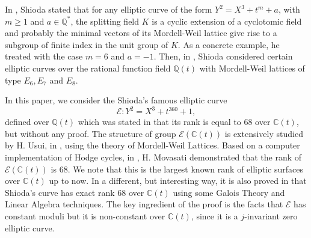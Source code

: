 \documentclass[11pt]{amsart}
\newcommand{\Q}{{\mathbb Q}}
\newcommand{\CC}{{\mathbb C}}
\newcommand{\Ee}{{\mathcal E}}
\newcommand{\KK}{{\mathcal K}}
\newcommand{\gal}{{\text{Gal}}}
\newcommand{\aut}{{\text{Aut}}}
\numberwithin{equation}{section}
\numberwithin{table}{section}
\newcommand\<{\langle}
\begin{document}

In \cite{Shioda1999a}, Shioda stated that for any elliptic curve of the form 
$Y^2 =X^3 + t^m +a$, with $m\geq 1$ and $a \in \Q^*$,  the splitting field $K$
is a cyclic extension of a cyclotomic field and probably the minimal vectors of its 
Mordell-Weil lattice give rise  to a subgroup of finite index in the unit group of $K$. 
As a concrete example, he treated with the case $m=6$ and $a=-1$.
Then, in \cite{Shioda1999}, Shioda considered certain elliptic curves over the rational function field  $\Q(t)$ with Mordell-Weil lattices of type $E_6, E_7$ and $E_8$.



In this paper, we  consider the  Shioda's famous  elliptic curve
\begin{equation}
	\label{shi-eq1}
	\Ee : Y^2=X^3 + t^{360} +1,
\end{equation}
defined over $\Q(t)$ which was stated in \cite{Shioda1992a} that its 
rank is equal to $68$ over $\CC(t)$, but without any proof. 
The structure of   group $\Ee (\CC(t))$ is extensively studied  
by H. Usui, in  \cites{Usui2008}, using the theory of Mordell-Weil Lattices.
Based on  a computer implementation of
Hodge cycles, in \cite[Sec. 15.13]{movasati2021course}, H. Movasati  demonstrated that  the rank of $\Ee(\CC(t))$ is $68$. We note that this is the largest known rank of elliptic surfaces over $\CC(t)$ up to now.
In a different, but interesting way,  it is also  proved in \cite{Chahal2000} that Shioda's curve has exact rank $68$ over $\CC(t)$  using some Galois Theory and   Linear Algebra techniques.
The key ingredient of the proof is  the facts that  $\Ee$ has   constant moduli 
but it is non-constant over $\CC(t)$, since it is a $j$-invariant  zero  elliptic curve.
\end{document}
